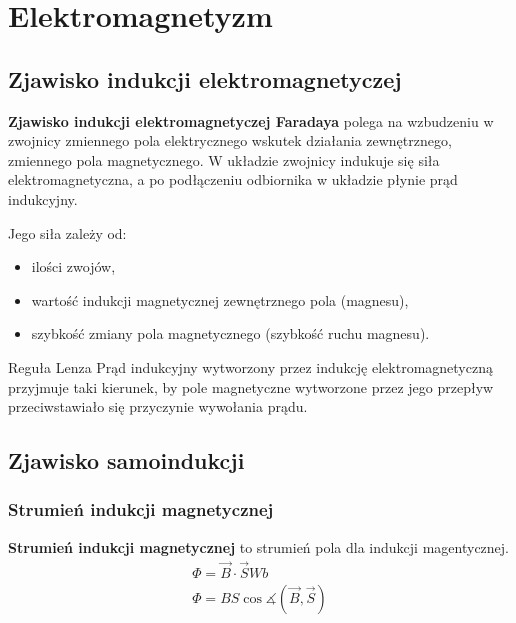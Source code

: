 \chapter{Elektromagnetyzm}

\section{Zjawisko indukcji elektromagnetyczej}\label{faraday}
\begin{definition}
  \textbf{Zjawisko indukcji elektromagnetyczej Faradaya} polega na wzbudzeniu w zwojnicy zmiennego
  pola elektrycznego wskutek działania zewnętrznego, zmiennego pola magnetycznego. W układzie
  zwojnicy indukuje się siła elektromagnetyczna, a po podłączeniu odbiornika w układzie płynie prąd
  indukcyjny.

  \vspace{1em}\noindent Jego siła zależy od:
  \begin{itemize}
    \item ilości zwojów,
    \item wartość indukcji magnetycznej zewnętrznego pola (magnesu),
    \item szybkość zmiany pola magnetycznego (szybkość ruchu magnesu).
  \end{itemize}
\end{definition}

\begin{law}{Reguła Lenza}
  Prąd indukcyjny wytworzony przez indukcję elektromagnetyczną przyjmuje taki kierunek, by pole
  magnetyczne wytworzone przez jego przepływ przeciwstawiało się przyczynie wywołania prądu.
\end{law}

\section{Zjawisko samoindukcji}

\subsection{Strumień indukcji magnetycznej}
\begin{definition}
  \textbf{Strumień indukcji magnetycznej} to strumień pola dla indukcji magentycznej.
  \begin{equation}
    \begin{gathered}
      \Phi = \vec B \cdot \vec S\unit{Wb}\\
      \Phi = BS \cos\measuredangle(\vec B, \vec S)
    \end{gathered}
  \end{equation}
\end{definition}

